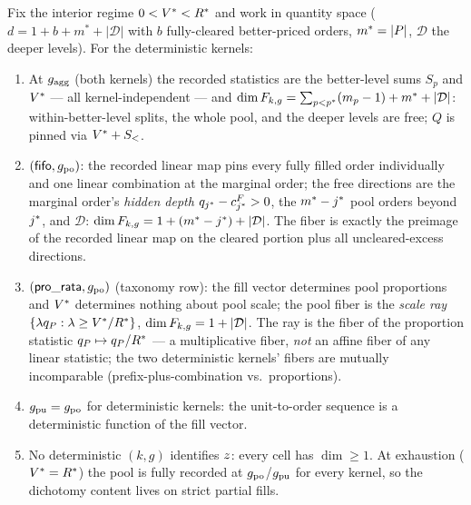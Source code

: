 \begin{proposition}
\label{prop:t1-det}
Fix the interior regime $0 < V^{*} < R^{*}$ and work in quantity space
($d = 1 + b + m^{*} + |\mathcal{D}|$ with $b$ fully-cleared better-priced
orders, $m^{*} = |P|$, $\mathcal{D}$ the deeper levels). For the
deterministic kernels:
\begin{enumerate}
\item[(i)] At $g_{\mathrm{agg}}$ (both kernels) the recorded statistics are the
better-level sums $S_p$ and $V^{*}$ --- all kernel-independent --- and
$\dim F_{k,g} = \sum_{p < p^{*}} (m_p - 1) + m^{*} + |\mathcal{D}|$: within-better-level
splits, the whole pool, and the deeper levels are free; $Q$ is pinned via
$V^{*} + S_{<}$.
\item[(ii)] $(\mathsf{fifo}, g_{\mathrm{po}})$: the recorded linear map pins every fully
filled order individually and one linear combination at the marginal order;
the free directions are the marginal order's \emph{hidden depth}
$q_{j^{*}} - c^{F}_{j^{*}} > 0$, the $m^{*} - j^{*}$ pool orders beyond
$j^{*}$, and $\mathcal{D}$: $\dim F_{k,g} = 1 + (m^{*} - j^{*}) +
|\mathcal{D}|$. The fiber is
exactly the preimage of the recorded linear map on the cleared portion plus
all uncleared-excess directions.
\item[(iii)] $(\mathsf{pro\_rata}, g_{\mathrm{po}})$ (taxonomy row): the fill vector determines
pool proportions and $V^{*}$ determines nothing about pool scale; the pool
fiber is the \emph{scale ray} $\{\lambda q_{P} : \lambda \geq V^{*}/R^{*}\}$,
$\dim F_{k,g} = 1 + |\mathcal{D}|$. The ray is the fiber of the proportion statistic
$q_{P} \mapsto q_{P}/R^{*}$ --- a multiplicative fiber, \emph{not} an affine
fiber of any linear statistic; the two deterministic kernels' fibers are
mutually incomparable (prefix-plus-combination vs.\ proportions).
\item[(iv)] $g_{\mathrm{pu}} = g_{\mathrm{po}}$ for deterministic kernels: the unit-to-order
sequence is a deterministic function of the fill vector.
\item[(v)] No deterministic $(k, g)$ identifies $z$: every cell has
$\dim \geq 1$. At exhaustion ($V^{*} = R^{*}$) the pool is fully recorded
at $g_{\mathrm{po}}$/$g_{\mathrm{pu}}$ for every kernel, so the dichotomy content lives on strict
partial fills.
\end{enumerate}
\end{proposition}


